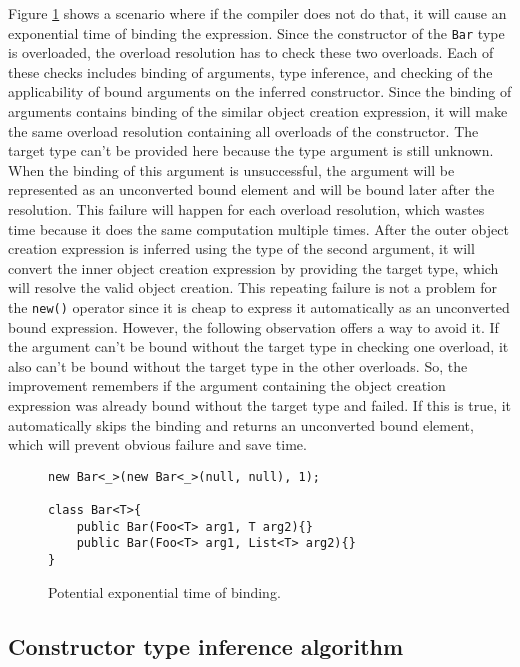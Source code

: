\par
Figure \ref{img61:exp} shows a scenario where if the compiler does not do that, it will cause an exponential time of binding the expression. 
Since the constructor of the \texttt{Bar} type is overloaded, the overload resolution has to check these two overloads. 
Each of these checks includes binding of arguments, type inference, and checking of the applicability of bound arguments on the inferred constructor. 
Since the binding of arguments contains binding of the similar object creation expression, it will make the
same overload resolution containing all overloads of the constructor. 
The target type can’t be provided here because the type argument is still unknown. 
When the binding of this argument is unsuccessful, the argument will be represented as an unconverted bound element and will be bound later after the resolution. 
This failure will happen for each overload resolution, which wastes time because it does the same computation multiple times. 
After the outer object creation expression is inferred using the type of the second argument, it will convert the inner object creation expression by providing the target type, which will resolve the valid object creation. 
This repeating failure is not a problem for the \texttt{new()} operator since it is cheap to express it automatically as an unconverted bound expression. 
However, the following observation offers a way to avoid it. 
If the argument can’t be bound without the target type in checking one overload, it also can’t be bound without the target type in the other overloads. 
So, the improvement remembers if the argument containing the object creation expression was already bound without the target type and failed. 
If this is true, it automatically skips the binding and returns an unconverted bound element, which will prevent obvious failure and save time.
\begin{figure}[h!]
\begin{lstlisting}[style=csharp, mathescape=true]
new Bar<_>(new Bar<_>(null, null), 1);

class Bar<T>{
    public Bar(Foo<T> arg1, T arg2){}
    public Bar(Foo<T> arg1, List<T> arg2){}
}
\end{lstlisting}
\caption{Potential exponential time of binding.}
\label{img61:exp}
\end{figure}

\subsection{Constructor type inference algorithm}


